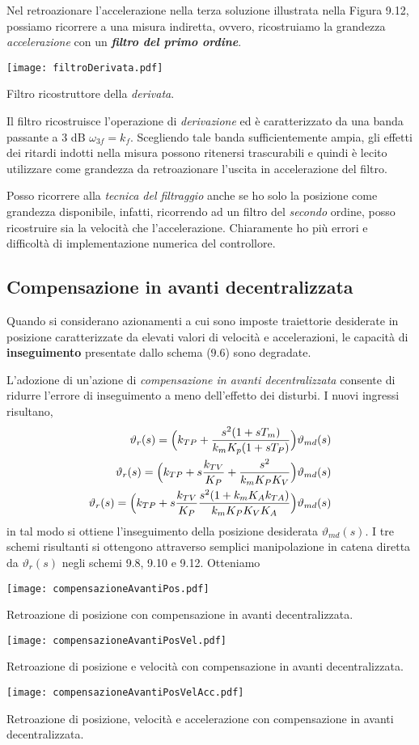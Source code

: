 Nel retroazionare l'accelerazione nella terza soluzione illustrata nella Figura 9.12, possiamo ricorrere a una misura indiretta, ovvero, ricostruiamo la grandezza \emph{accelerazione} con un \textit{\textbf{filtro del primo ordine}}.
\begin{center}
	\texttt{[image: filtroDerivata.pdf]}
	\caption{Filtro ricostruttore della \emph{derivata}.}
\end{center}

Il filtro ricostruisce l'operazione di \emph{derivazione} ed è caratterizzato da una banda passante a 3 dB $\omega_{3f} = k_f$. Scegliendo tale banda sufficientemente ampia, gli effetti dei ritardi indotti nella misura possono ritenersi trascurabili e quindi è lecito utilizzare come grandezza da retroazionare l'uscita in accelerazione del filtro.

Posso ricorrere alla \emph{tecnica del filtraggio} anche se ho solo la posizione come grandezza disponibile, infatti, ricorrendo ad un filtro del \emph{secondo} ordine, posso ricostruire sia la velocità che l'accelerazione. Chiaramente ho più errori e difficoltà di implementazione numerica del controllore.

\subsection{Compensazione in avanti decentralizzata}
Quando si considerano azionamenti a cui sono imposte traiettorie desiderate in posizione caratterizzate da elevati valori di velocità e accelerazioni, le capacità di \textbf{inseguimento} presentate dallo schema ($9.6$) sono degradate. 

L'adozione di un'azione di \emph{compensazione in avanti decentralizzata} consente di ridurre l'errore di inseguimento a meno dell'effetto dei disturbi. I nuovi ingressi risultano,
\begin{align}
	\vartheta_r(s) = \Bigl( k_{TP} + \frac{s^2(1+sT_m)}{k_mK_p(1+sT_P)}  \Bigr) \vartheta_{md}(s) \\
	\vartheta_r(s) = \Bigl( k_{TP} + s\frac{k_{TV}}{K_P} + \frac{s^2}{k_mK_PK_V} \Bigr) \vartheta_{md}(s) \\
	\vartheta_r(s) = \Bigl( k_{TP} + s\frac{k_{TV}}{K_P} \frac{s^2(1+k_mK_Ak_{TA})}{k_mK_PK_VK_A}\Bigr) \vartheta_{md}(s)
\end{align}
in tal modo si ottiene l'inseguimento della posizione desiderata $\vartheta_{md}(s)$. I tre schemi risultanti si ottengono attraverso semplici manipolazione in catena diretta da $\vartheta_r(s)$ negli schemi 9.8, 9.10 e 9.12. Otteniamo
\begin{center}
	\texttt{[image: compensazioneAvantiPos.pdf]}
	\caption{Retroazione di posizione con compensazione in avanti decentralizzata.}
	
	\texttt{[image: compensazioneAvantiPosVel.pdf]}
	\caption{Retroazione di posizione e velocità con compensazione in avanti decentralizzata.}
	
	\texttt{[image: compensazioneAvantiPosVelAcc.pdf]}
	\caption{Retroazione di posizione, velocità e accelerazione con compensazione in avanti decentralizzata.}
\end{center}

